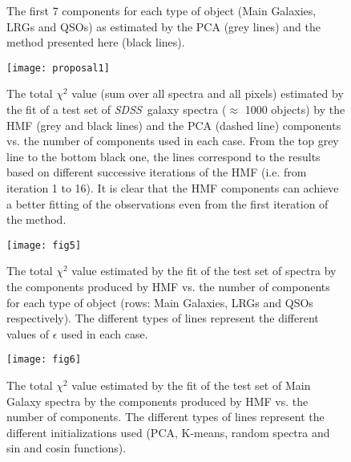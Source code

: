 \documentclass[12pt,preprint]{aastex}
\newcommand{\project}[1]{\textsl{#1}}
\newcommand{\sdss}{\project{SDSS}}
\newcommand{\SDSS}{\sdss}
\begin{document}
\clearpage

\begin{figure}
\end{figure}
\begin{figure}
\caption{The first 7 components for each type of object (Main Galaxies, LRGs and QSOs) as estimated by the PCA (grey lines) and the method presented here (black lines).}
\label{fig:2}
\end{figure}

\clearpage
\begin{figure}
\texttt{[image: proposal1]}
\caption{The total $\chi^2$ value (sum over all spectra and all pixels) estimated by the fit of a test set of \SDSS\ galaxy spectra ($\approx$ 1000 objects) by the HMF (grey and black lines) and the PCA (dashed line) components vs. the number of components used in each case. From the top grey line to the bottom black one, the lines correspond to the results based on different successive iterations of the HMF (i.e. from iteration 1 to 16). It is clear that the HMF components can achieve a better fitting of the observations even from the first iteration of the method.}
\label{fig:2b}
\end{figure}

\clearpage
\begin{figure}
\texttt{[image: fig5]}
\caption{The total $\chi^2$ value estimated by the fit of the test set
  of spectra by the components produced by HMF vs. the number
  of components for each type of object (rows: Main Galaxies, LRGs and QSOs
  respectively). The different types of lines represent the different
  values of $\epsilon$ used in each case.}
\label{fig:3}
\end{figure}

\clearpage
\begin{figure}
\texttt{[image: fig6]}
\caption{The total $\chi^2$ value estimated by the fit of the test set
  of Main Galaxy spectra by the components produced by HMF vs. the
  number of components. The different types of lines represent the
  different initializations used (PCA, K-means, random spectra and sin
  and cosin functions).}
\label{fig:4}
\end{figure}
\end{document}
